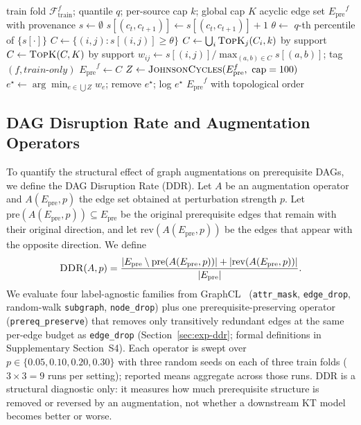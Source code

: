 \documentclass[pdflatex,sn-mathphys-num]{sn-jnl}
\newcommand{\Epre}{\ensuremath{E_{\text{pre}}}}
\newcommand{\DDR}{\textsc{DDR}}
\newcommand{\rev}[1]{\hl{#1}}
\newcommand{\rev}[1]{#1}
\begin{document}
\begin{algorithm}[t]
\caption{\rev{Train-only prerequisite graph construction with DAG audit}}
\label{alg:graph-build}
\begin{algorithmic}[1]
\Require train fold $\mathcal{F}^f_{\text{train}}$; quantile $q$; per-source cap
  $k$; global cap $K$
\Ensure acyclic edge set $\Epre^f$ with provenance
\State $s \gets \emptyset$ 
    \State $s[(c_t,c_{t+1})] \gets s[(c_t,c_{t+1})] + 1$
  \EndFor
\EndFor
\State $\theta \gets$ $q$-th percentile of $\{s[\cdot]\}$ 
\State $C \gets \{(i,j) : s[(i,j)] \ge \theta\}$
\State $C \gets \bigcup_{i} \textsc{TopK}_{j}(C_i, k)$ by support 
\State $C \gets \textsc{TopK}(C, K)$ by support 
  \State $w_{ij} \gets s[(i,j)]/\max_{(a,b)\in C} s[(a,b)]$; tag $(f,\textit{train-only})$
\EndFor
\State $\Epre^f \gets C$
\While{$\Epre^f$ contains a cycle} 
  \State $Z \gets \textsc{JohnsonCycles}(\Epre^f,\ \text{cap}=100)$
  \State $e^\star \gets \arg\min_{e\in\bigcup Z} w_e$; remove $e^\star$; log $e^\star$
\EndWhile
\State \Return $\Epre^f$ with topological order
\end{algorithmic}
\end{algorithm}

\subsection{DAG Disruption Rate and Augmentation Operators}
\label{sec:ddr}
To quantify the structural effect of graph augmentations on prerequisite
DAGs, we define the DAG Disruption Rate (\DDR{}). Let $A$ be an
augmentation operator and $A(\Epre,p)$ the edge set obtained at
perturbation strength $p$. Let $\mathrm{pre}(A(\Epre,p))\subseteq\Epre$
be the original prerequisite edges that remain with their original
direction, and let $\mathrm{rev}(A(\Epre,p))$ be the edges that appear
with the opposite direction. We define
\begin{equation}
\DDR(A,p)=
\frac{|\Epre\setminus \mathrm{pre}(A(\Epre,p))|
      +|\mathrm{rev}(A(\Epre,p))|}
     {|\Epre|}.
\label{eq:ddr}
\end{equation}
We evaluate four label-agnostic families from GraphCL~\cite{you2020graphcl}
(\texttt{attr\_mask}, \texttt{edge\_drop}, random-walk \texttt{subgraph},
\texttt{node\_drop}) plus one prerequisite-preserving operator
(\texttt{prereq\_preserve}) that removes only transitively redundant edges at
the same per-edge budget as \texttt{edge\_drop} (Section~\ref{sec:exp-ddr};
formal definitions in Supplementary Section~S4).
Each operator is swept over $p\in\{0.05,0.10,0.20,0.30\}$ with three
random seeds on each of three train folds ($3\times 3=9$ runs per
setting); reported means aggregate across those runs. \DDR{} is a structural diagnostic only: it measures how
much prerequisite structure is removed or reversed by an augmentation,
not whether a downstream KT model becomes better or worse.
\end{document}

